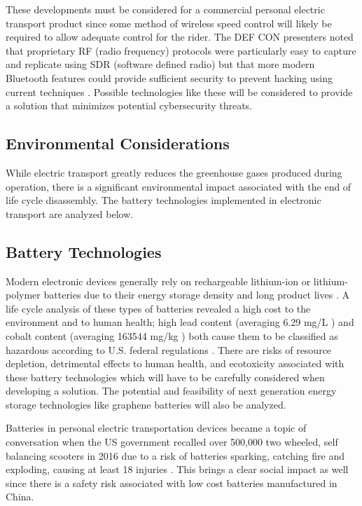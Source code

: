 These developments must be considered for a commercial personal electric transport product since some method of wireless speed control will likely be required to allow adequate control for the rider. The DEF CON presenters noted that proprietary RF (radio frequency) protocols were particularly easy to capture and replicate using SDR (software defined radio) \cite{Radio}\cite{DEFCON} but that more modern Bluetooth features could provide sufficient security to prevent hacking using current techniques \cite{DEFCON}. Possible technologies like these will be considered to provide a solution that minimizes potential cybersecurity threats.

\subsection{Environmental Considerations}
While electric transport greatly reduces the greenhouse gases produced during operation, there is a significant environmental impact associated with the end of life cycle disassembly. The battery technologies implemented in electronic transport are analyzed below.
\subsection{Battery Technologies}
Modern electronic devices generally rely on rechargeable lithium-ion or lithium-polymer batteries due to their energy storage density and long product lives \cite{BatteryRecharge}. A life cycle analysis of these types of batteries revealed a high cost to the environment and to human health; high lead content (averaging 6.29 mg/L \cite{BatteryRecharge}) and cobalt content (averaging 163544 mg/kg \cite{BatteryRecharge}) both cause them to be classified as hazardous according to U.S. federal regulations \cite{BatteryRecharge}. There are risks of  resource depletion, detrimental effects to human health, and ecotoxicity associated with these battery technologies \cite{BatteryRecharge} which will have to be carefully considered when developing a solution. The potential and feasibility of next generation energy storage technologies like graphene batteries \cite{Graphene} will also be analyzed.

Batteries in personal electric transportation devices became a topic of conversation when the US government recalled over 500,000 two wheeled, self balancing scooters in 2016 due to a risk of batteries sparking, catching fire and exploding, causing at least 18 injuries \cite{CBCArticle}. This brings a clear social impact as well since there is a safety risk associated with low cost batteries manufactured in China\cite{CBCArticle}.

